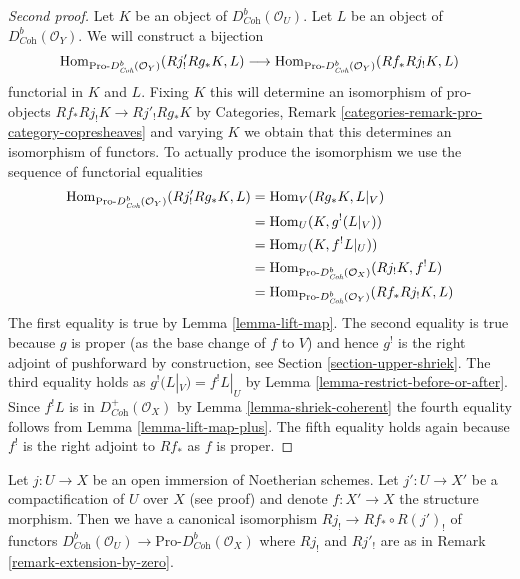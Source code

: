 \begin{proof}[Second proof]
Let $K$ be an object of $D^b_{\textit{Coh}}(\mathcal{O}_U)$.
Let $L$ be an object of $D^b_{\textit{Coh}}(\mathcal{O}_Y)$.
We will construct a bijection
$$
\mathop{\mathrm{Hom}}\nolimits_{\text{Pro-}D^b_{\textit{Coh}}(\mathcal{O}_Y)}(Rj'_!Rg_*K, L)
\longrightarrow
\mathop{\mathrm{Hom}}\nolimits_{\text{Pro-}D^b_{\textit{Coh}}(\mathcal{O}_Y)}(Rf_*Rj_!K, L)
$$
functorial in $K$ and $L$. Fixing $K$ this will determine an isomorphism
of pro-objects
$Rf_*Rj_!K \to Rj'_!Rg_*K$
by Categories, Remark \ref{categories-remark-pro-category-copresheaves}
and varying $K$ we obtain that this determines
an isomorphism of functors. To actually produce the isomorphism we
use the sequence of functorial equalities
\begin{align*}
\mathop{\mathrm{Hom}}\nolimits_{\text{Pro-}D^b_{\textit{Coh}}(\mathcal{O}_Y)}(Rj'_!Rg_*K, L)
& =
\mathop{\mathrm{Hom}}\nolimits_V(Rg_*K, L|_V) \\
& =
\mathop{\mathrm{Hom}}\nolimits_U(K, g^!(L|_V)) \\
& =
\mathop{\mathrm{Hom}}\nolimits_U(K, f^!L|_U)) \\
& =
\mathop{\mathrm{Hom}}\nolimits_{\text{Pro-}D^b_{\textit{Coh}}(\mathcal{O}_X)}(Rj_!K, f^!L) \\
& =
\mathop{\mathrm{Hom}}\nolimits_{\text{Pro-}D^b_{\textit{Coh}}(\mathcal{O}_Y)}(Rf_*Rj_!K, L)
\end{align*}
The first equality is true by Lemma \ref{lemma-lift-map}.
The second equality is true because $g$ is proper (as the base change
of $f$ to $V$) and hence $g^!$ is the right adjoint of pushforward by
construction, see Section \ref{section-upper-shriek}.
The third equality holds as $g^!(L|_V) = f^!L|_U$ by
Lemma \ref{lemma-restrict-before-or-after}.
Since $f^!L$ is in $D^+_{\textit{Coh}}(\mathcal{O}_X)$ by
Lemma \ref{lemma-shriek-coherent} the fourth equality follows from 
Lemma \ref{lemma-lift-map-plus}. The fifth equality holds again
because $f^!$ is the right adjoint to $Rf_*$ as $f$ is proper.
\end{proof}

\begin{lemma}
\label{lemma-well-defined}
Let $j : U \to X$ be an open immersion of Noetherian schemes.
Let $j' : U \to X'$ be a compactification of $U$ over $X$ (see proof)
and denote $f : X' \to X$ the structure morphism.
Then we have a canonical isomorphism $Rj_! \to Rf_* \circ R(j')_!$
of functors $D^b_{\textit{Coh}}(\mathcal{O}_U) \to
\text{Pro-}D^b_{\textit{Coh}}(\mathcal{O}_X)$ where
$Rj_!$ and $Rj'_!$ are as in Remark \ref{remark-extension-by-zero}.
\end{lemma}


